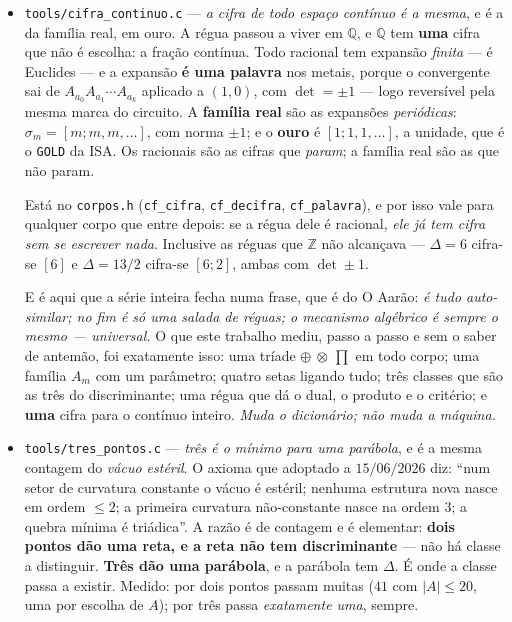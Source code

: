 \documentclass[11pt]{article}
\newcommand{\code}[1]{\texttt{\small #1}}
\newcommand{\Z}{\mathbb Z}
\newcommand{\Q}{\mathbb Q}
\theoremstyle{plain}
\theoremstyle{remark}
\begin{document}
\begin{itemize}
E nada disto pede \emph{float}: $\Q$ está exato aqui desde \code{racional\_pg.c}. \emph{O corpo
contínuo que faltava já estava no toolkit --- media-se a régua com a régua errada.}
\item \code{tools/cifra\_continuo.c} --- \emph{a cifra de todo espaço contínuo é a mesma}, e é
a da família real, em ouro. A régua passou a viver em $\Q$, e $\Q$ tem \textbf{uma} cifra que não
é escolha: a fração contínua. Todo racional tem expansão \emph{finita} --- é Euclides --- e a
expansão \textbf{é uma palavra} nos metais, porque o convergente sai de
$A_{a_0}A_{a_1}\cdots A_{a_k}$ aplicado a $(1,0)$, com $\det = \pm1$ --- logo reversível pela mesma
marca do circuito. A \textbf{família real} são as expansões \emph{periódicas}: $\sigma_m = [m;m,m,\dots]$,
com norma $\pm1$; e o \textbf{ouro} é $[1;1,1,\dots]$, a unidade, que é o \code{GOLD} da ISA. Os
racionais são as cifras que \emph{param}; a família real são as que não param.

Está no \code{corpos.h} (\code{cf\_cifra}, \code{cf\_decifra}, \code{cf\_palavra}), e por isso
vale para qualquer corpo que entre depois: se a régua dele é racional, \emph{ele já tem cifra sem
se escrever nada}. Inclusive as réguas que $\Z$ não alcançava --- $\Delta = 6$ cifra-se $[6]$ e
$\Delta = 13/2$ cifra-se $[6;2]$, ambas com $\det \pm 1$.

E é aqui que a série inteira fecha numa frase, que é do O Aarão: \emph{é tudo auto-similar; no fim é
só uma salada de réguas; o mecanismo algébrico é sempre o mesmo --- universal.} O que este
trabalho mediu, passo a passo e sem o saber de antemão, foi exatamente isso: uma tríade
$\oplus\ \otimes\ \prod$ em todo corpo; uma família $A_m$ com um parâmetro; quatro setas ligando
tudo; três classes que são as três do discriminante; uma régua que dá o dual, o produto e o
critério; e \textbf{uma} cifra para o contínuo inteiro. \emph{Muda o dicionário; não muda a
máquina.}
\item \code{tools/tres\_pontos.c} --- \emph{três é o mínimo para uma parábola}, e é a mesma
contagem do \emph{vácuo estéril}. O axioma que adoptado a $15/06/2026$ diz: ``num setor de
curvatura constante o vácuo é estéril; nenhuma estrutura nova nasce em ordem $\le 2$; a primeira
curvatura não-constante nasce na ordem $3$; a quebra mínima é triádica''. A razão é de contagem e
é elementar: \textbf{dois pontos dão uma reta, e a reta não tem discriminante} --- não há classe a
distinguir. \textbf{Três dão uma parábola}, e a parábola tem $\Delta$. É onde a classe passa a
existir. Medido: por dois pontos passam muitas ($41$ com $|A|\le20$, uma por escolha de $A$); por
três passa \emph{exatamente uma}, sempre.


\end{itemize}
\end{document}
